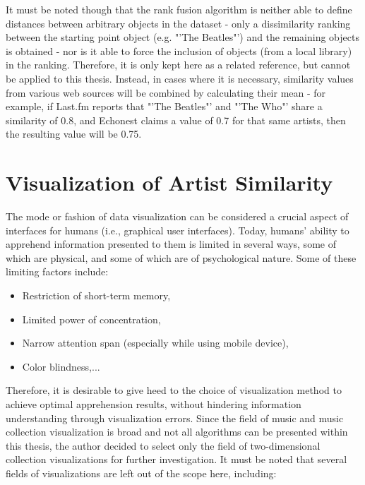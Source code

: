 It must be noted though that the rank fusion algorithm is neither able to define distances between arbitrary objects in the dataset - only a dissimilarity ranking between the starting point object (e.g. "'The Beatles"') and the remaining objects is obtained - nor is it able to force the inclusion of objects (from a local library) in the ranking. Therefore, it is only kept here as a related reference, but cannot be applied to this thesis. Instead, in cases where it is necessary, similarity values from various web sources will be combined by calculating their mean - for example, if Last.fm reports that "'The Beatles"' and "'The Who"' share a similarity of 0.8, and Echonest claims a value of 0.7 for that same artists, then the resulting value will be 0.75.

\section{Visualization of Artist Similarity}

The mode or fashion of data visualization can be considered a crucial aspect of interfaces for humans (i.e., graphical user interfaces). Today, humans' ability to apprehend information presented to them is limited in several ways, some of which are physical, and some of which are of psychological nature. Some of these limiting factors include:

\begin{itemize}
	\item Restriction of short-term memory,
	\item Limited power of concentration,
	\item Narrow attention span (especially while using mobile device),
	\item Color blindness,...
\end{itemize}

Therefore, it is desirable to give heed to the choice of visualization method to achieve optimal apprehension results, without hindering information understanding through visualization errors. Since the field of music and music collection visualization is broad and not all algorithms can be presented within this thesis, the author decided to select only the field of two-dimensional collection visualizations for further investigation. It must be noted that several fields of visualizations are left out of the scope here, including:

